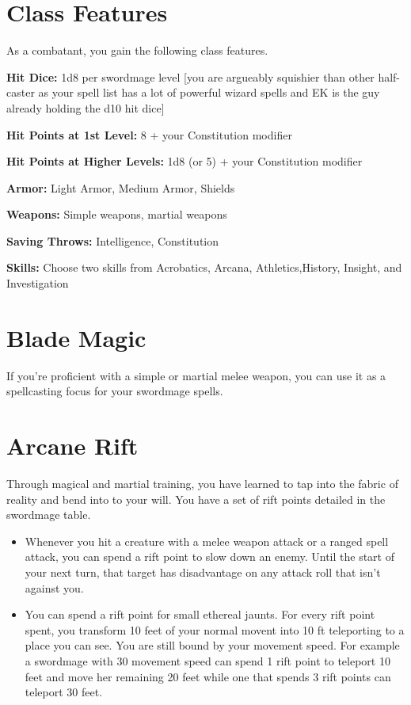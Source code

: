 \begin{multicols*}{2}



\section*{Class Features} 

As a combatant, you gain the following class features.

\textbf{Hit Dice:} 1d8 per swordmage level {\color{red} [you are argueably squishier than other half-caster as your spell list has a lot of powerful wizard spells and EK is the guy already holding the d10 hit dice]}

\textbf{Hit Points at 1st Level:} 8 + your Constitution modifier

\textbf{Hit Points at Higher Levels:} 1d8 (or 5) + your Constitution modifier


\textbf{Armor:} Light Armor, Medium Armor, Shields

\textbf{Weapons:} Simple weapons, martial weapons

\textbf{Saving Throws:} Intelligence, Constitution

\textbf{Skills:} Choose two skills from Acrobatics, Arcana, Athletics,History, Insight, and Investigation


\section*{Blade Magic}

If you’re proficient with a simple or martial melee weapon, you can use it as a spellcasting focus for your swordmage spells.

\section*{Arcane Rift} 

Through magical and martial training, you have learned to tap into the fabric of reality and bend into to your will.
You have a set of rift points detailed in the swordmage table. 


\begin{itemize}
    \item Whenever you hit a creature with a melee weapon attack or a ranged spell attack,
    you can spend a rift point to slow down an enemy.
    Until the start of your next turn, that target has disadvantage on any attack roll that isn't against you.
    \item You can spend a rift point for small ethereal jaunts. For every rift point spent, you transform 10 feet of your normal movent into 10 ft teleporting to a place you can see. You are still bound by your movement speed. For example a swordmage with 30 movement speed can spend 1 rift point to teleport 10 feet and move her remaining 20 feet while one that spends 3 rift points can teleport 30 feet.
\end{itemize}


\end{multicols*}
